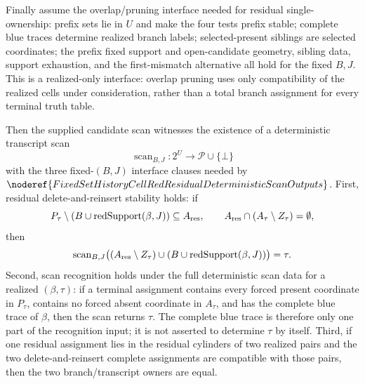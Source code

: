 \begin{helper}
Finally assume the overlap/pruning interface needed for residual
single-ownership: prefix sets lie in \(U\) and make the four tests prefix
stable; complete blue traces determine realized branch labels;
selected-present siblings are selected coordinates; the prefix fixed support
and open-candidate geometry, sibling data, support exhaustion, and the
first-mismatch alternative all hold for the fixed \(B,J\).  This is a
realized-only interface: overlap pruning uses only compatibility of the
realized cells under consideration, rather than a total branch assignment for
every terminal truth table.

Then the supplied candidate scan witnesses the existence of a deterministic
transcript scan
\[
\operatorname{scan}_{B,J}:2^U\to\mathcal P\cup\{\bot\}
\]
with the three fixed-\((B,J)\) interface clauses needed by
\(\noderef{FixedSetHistoryCellRedResidualDeterministicScanOutputs}\).
First, residual delete-and-reinsert stability holds: if
\[
P_\tau\setminus(B\cup\operatorname{redSupport}(\beta,J))
  \subseteq A_{\rm res},\qquad
A_{\rm res}\cap(A_\tau\setminus Z_\tau)=\emptyset,
\]
then
\[
\operatorname{scan}_{B,J}\bigl((A_{\rm res}\setminus Z_\tau)\cup
  (B\cup\operatorname{redSupport}(\beta,J))\bigr)=\tau .
\]
Second, scan recognition holds under the full deterministic scan data for a
realized \((\beta,\tau)\): if a terminal assignment contains every forced
present coordinate in \(P_\tau\), contains no forced absent coordinate in
\(A_\tau\), and has the complete blue trace of \(\beta\), then the scan
returns \(\tau\).  The complete blue trace is therefore only one part of the
recognition input; it is not asserted to determine \(\tau\) by itself.
Third, if one residual assignment lies in the residual cylinders of two
realized pairs and the two delete-and-reinsert complete assignments are
compatible with those pairs, then the two branch/transcript owners are equal.
\end{helper}

